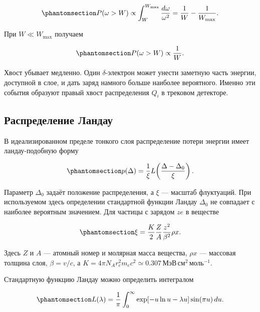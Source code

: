 \documentclass[
  russian,
  11pt,
  a4paper,
  open=any]{scrbook}
\begin{document}
\begin{equation}\protect\phantomsection\label{eq-ch5-large-transfer-probability}{
P(\omega>W)
\propto
\int_W^{W_{\max}}\frac{d\omega}{\omega^2}
=\frac1W-\frac1{W_{\max}}.
}\end{equation}

При \(W\ll W_{\max}\) получаем

\begin{equation}\protect\phantomsection\label{eq-ch5-large-transfer-tail}{
P(\omega>W)\propto\frac1W.
}\end{equation}

Хвост убывает медленно. Один \(\delta\)-электрон может унести заметную
часть энергии, доступной в слое, и дать заряд намного больше наиболее
вероятного. Именно эти события образуют правый хвост распределения
\(Q_i\) в трековом детекторе.

\subsection{Распределение Ландау}\label{interactive-landau-tail}

В идеализированном пределе тонкого слоя распределение потери энергии
имеет ландау-подобную форму

\begin{equation}\protect\phantomsection\label{eq-ch5-landau-location-scale}{
p(\Delta)
=\frac1\xi
L\!\left(\frac{\Delta-\Delta_0}{\xi}\right).
}\end{equation}

Параметр \(\Delta_0\) задаёт положение распределения, а \(\xi\) ---
масштаб флуктуаций. При используемом здесь определении стандартной
функции Ландау \(\Delta_0\) не совпадает с наиболее вероятным значением.
Для частицы с зарядом \(ze\) в веществе

\begin{equation}\protect\phantomsection\label{eq-ch5-landau-scale}{
\xi=
\frac K2\frac ZA\frac{z^2}{\beta^2}\rho x.
}\end{equation}

Здесь \(Z\) и \(A\) --- атомный номер и молярная масса вещества,
\(\rho x\) --- массовая толщина слоя, \(\beta=v/c\), а
\(K=4\pi N_A r_e^2m_ec^2\simeq0.307\,
\text{МэВ}\,\text{см}^2\,\text{моль}^{-1}\).

Стандартную функцию Ландау можно определить интегралом

\begin{equation}\protect\phantomsection\label{eq-ch5-landau-integral}{
L(\lambda)=
\frac1\pi\int_0^\infty
\exp[-u\ln u-\lambda u]\sin(\pi u)\,du.
}\end{equation}
\end{document}
